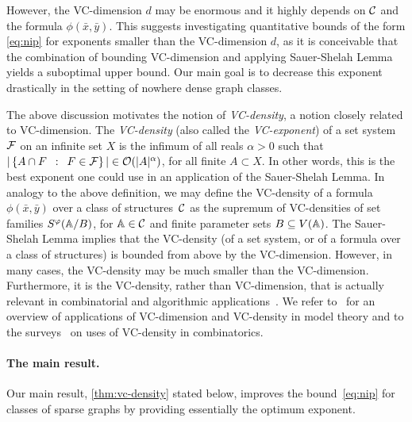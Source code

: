 However, the VC-dimension $d$ may be enormous and it highly depends on $\cal C$ and the formula $\phi(\bar x,\bar y)$.
This suggests investigating quantitative bounds of the form \eqref{eq:nip} for exponents smaller than the VC-dimension $d$, as it is conceivable that the combination of bounding VC-dimension and applying
Sauer-Shelah Lemma yields a suboptimal upper bound. Our main goal is to decrease this exponent drastically in the setting of nowhere dense graph classes.

The above discussion motivates the notion of \emph{VC-density}, a notion closely related to VC-dimension.
The \emph{VC-density} (also called the 
\emph{VC-exponent})
of a set system $\cal F$
on an infinite set $X$ is the infimum of all reals $\alpha>0$ such that 
$|\setof{A\cap F}{F\in \cal F}|\in \Oof(|A|^\alpha)$, for all finite $A\subset X$. In other words, this is the best exponent one could use in an application of the Sauer-Shelah Lemma. 
In analogy to the above definition, we may define the VC-density of a formula $\phi(\bar x,\bar y)$ over a class of structures~$\cal C$
as the supremum of VC-densities of set families $S^\phi(\str A/B)$, for $\str A\in \cal C$ and finite parameter sets $B\subseteq V(\str A)$. 
The Sauer-Shelah Lemma
implies that the VC-density (of a set system, or of a formula over a class of structures) is bounded from above by the VC-dimension. 
However, in many cases, the VC-density may be much smaller than the VC-dimension. Furthermore, it is the VC-density, rather than VC-dimension, that is actually relevant in combinatorial
and algorithmic applications~\cite{Bronnimann1995,matouvsek1998geometric,Matousek:2004:BVI:1005787.1005789}.
We refer to~\cite{aschenbrenner2016vapnik} for an overview of 
applications of VC-dimension and VC-density in model
theory and to the surveys~\cite{furedi1991traces,matouvsek1998geometric} 
on uses of VC-density in
combinatorics. 

\paragraph{The main result.}
Our main result, \cref{thm:vc-density} stated below, improves the bound~\eqref{eq:nip} for classes of sparse graphs
by providing essentially the optimum exponent.


